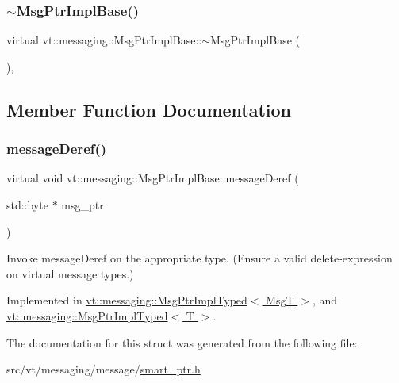 \subsubsection{\texorpdfstring{$\sim$\+Msg\+Ptr\+Impl\+Base()}{~MsgPtrImplBase()}}
{\footnotesize\ttfamily virtual vt\+::messaging\+::\+Msg\+Ptr\+Impl\+Base\+::$\sim$\+Msg\+Ptr\+Impl\+Base (\begin{DoxyParamCaption}{ }\end{DoxyParamCaption})\hspace{0.3cm}{\ttfamily [inline]}, {\ttfamily [virtual]}}



\subsection{Member Function Documentation}
\mbox{\label{structvt_1_1messaging_1_1_msg_ptr_impl_base_a1fcd13da7faa98a9d4681e572d4b494b}} 
\subsubsection{\texorpdfstring{message\+Deref()}{messageDeref()}}
{\footnotesize\ttfamily virtual void vt\+::messaging\+::\+Msg\+Ptr\+Impl\+Base\+::message\+Deref (\begin{DoxyParamCaption}\item[{std\+::byte $\ast$}]{msg\+\_\+ptr }\end{DoxyParamCaption})\hspace{0.3cm}{\ttfamily [pure virtual]}}

Invoke message\+Deref on the appropriate type. (Ensure a valid delete-\/expression on virtual message types.) 

Implemented in \hyperlink{structvt_1_1messaging_1_1_msg_ptr_impl_typed_abb63f6d84ef154dfb315e9ed25775c15}{vt\+::messaging\+::\+Msg\+Ptr\+Impl\+Typed$<$ Msg\+T $>$}, and \hyperlink{structvt_1_1messaging_1_1_msg_ptr_impl_typed_abb63f6d84ef154dfb315e9ed25775c15}{vt\+::messaging\+::\+Msg\+Ptr\+Impl\+Typed$<$ T $>$}.



The documentation for this struct was generated from the following file\+:\begin{DoxyCompactItemize}
\item 
src/vt/messaging/message/\hyperlink{smart__ptr_8h}{smart\+\_\+ptr.\+h}\end{DoxyCompactItemize}
